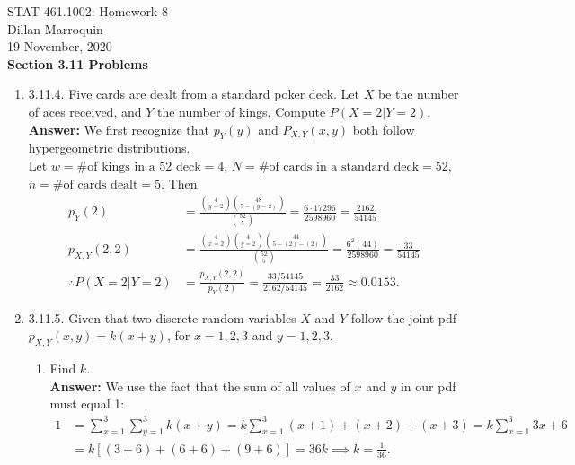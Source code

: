 \documentclass{article}
\begin{document}
    \noindent STAT 461.1002: Homework 8\\
    Dillan Marroquin\\
    19 November, 2020\\

    \noindent \textbf{Section 3.11 Problems}
    \begin{enumerate}
        \item 3.11.4. Five cards are dealt from a standard poker deck. Let $X$ be the number of aces received, and $Y$ the number of kings. Compute $P(X = 2|Y = 2)$.\\
        \textbf{Answer: }We first recognize that $p_Y(y)$ and $P_{X,Y}(x,y)$ both follow hypergeometric distributions.\\Let $w = \text{\# of kings in a 52 deck} = 4$, $N = \text{\# of cards in a standard deck} = 52$, $n = \text{\# of cards dealt} = 5$. Then
        \begin{align*}
            p_Y(2) &= \frac{\displaystyle{4 \choose y=2}{48 \choose 5-(y=2)}}{\displaystyle{52 \choose 5}} = \frac{6 \cdot 17296}{2598960} = \frac{2162}{54145}\\
            p_{X,Y}(2,2) &= \frac{\displaystyle{4 \choose x=2}{4 \choose y=2}{44 \choose 5-(2)-(2)}}{\displaystyle{52 \choose 5}} = \frac{6^2(44)}{2598960} = \frac{33}{54145}\\
            \therefore P(X = 2|Y = 2) &= \frac{p_{X,Y}(2,2)}{p_Y(2)} = \frac{33/54145}{2162/54145} = \frac{33}{2162} \approx 0.0153.
        \end{align*}
            
        \item 3.11.5. Given that two discrete random variables $X$ and $Y$ follow the joint pdf $p_{X,Y} (x, y) = k(x + y)$, for $x = 1, 2, 3$ and $y = 1, 2, 3$,
        \begin{enumerate}
            \item Find $k$.\\
            \textbf{Answer: } We use the fact that the sum of all values of $x$ and $y$ in our pdf must equal 1:
            \begin{align*}
                1 &= \sum_{x=1}^3 \sum_{y=1}^3 k(x+y) = k \sum_{x=1}^3 (x+1)+(x+2)+(x+3) = k\sum_{x=1}^3 3x+6\\
                &= k[(3+6)+(6+6)+(9+6)] = 36k
                \implies k = \frac{1}{36}.
            \end{align*}
            

\end{enumerate}
\end{enumerate}
\end{document}
